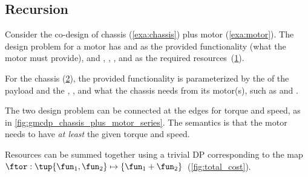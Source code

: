 \FloatBarrier\vfill\clearpage %

\subsection{Recursion}

\begin{example}
    \label{exa:chassis_plus_motor}
    Consider the co-design of chassis (\cref{exa:chassis}) plus motor (\cref{exa:motor}).
    The design problem for a motor has  and  as the provided functionality (what the motor must provide), and , , , and  as the required resources~(\cref{fig:motor}).

    \begin{figure}[h!]
        \centering
        \caption{}
        \label{fig:motor}
    \end{figure}

    For the chassis (\cref{fig:gmcdp_chassis}), the provided functionality is parameterized by the  of the payload and the , , and what the chassis needs from its motor(s), such as  and .

    \begin{figure}[h!]
        \centering
        \caption{}
        \label{fig:gmcdp_chassis}
    \end{figure}

    The two design problem can be connected at the edges for torque and speed, as in \cref{fig:gmcdp_chassis_plus_motor_series}.
    The semantics is that the motor needs to have \emph{at least} the given torque and speed.


    \begin{figure*}[h!]
        \centering
        \caption{}
        \label{fig:gmcdp_chassis_plus_motor_series}
    \end{figure*}

    Resources can be summed together using a trivial DP corresponding to the map $\ftor:\tup{\fun_{1},\fun_{2}} \mapsto\{\fun_{1}+\fun_{2}\}$~(\cref{fig:total_cost}).


\end{example}
